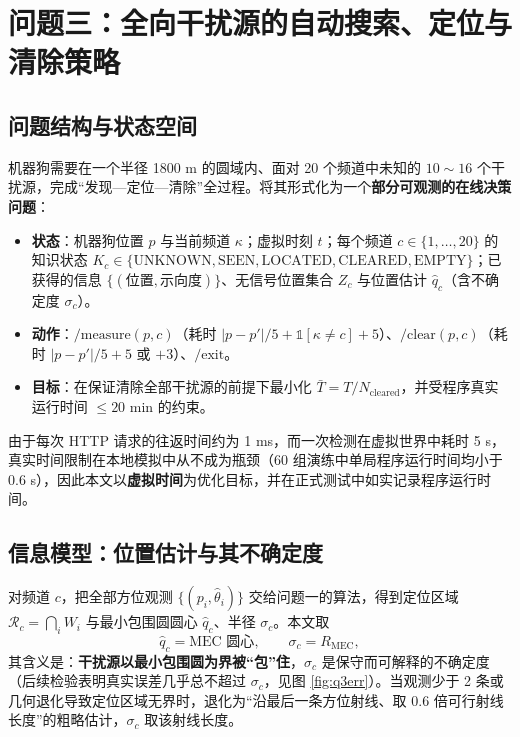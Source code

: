 
\section{问题三：全向干扰源的自动搜索、定位与清除策略}

\subsection{问题结构与状态空间}

机器狗需要在一个半径 1800 m 的圆域内、面对 20 个频道中未知的 $10\sim16$ 个干扰源，完成“发现—定位—清除”全过程。将其形式化为一个\textbf{部分可观测的在线决策问题}：

\begin{itemize}
  \item \textbf{状态}：机器狗位置 $p$ 与当前频道 $\kappa$；虚拟时刻 $t$；每个频道 $c\in\{1,\dots,20\}$ 的知识状态 $K_c\in\{\text{UNKNOWN},\text{SEEN},\text{LOCATED},\text{CLEARED},\text{EMPTY}\}$；已获得的信息 $\{(\text{位置},\text{示向度})\}$、无信号位置集合 $Z_c$ 与位置估计 $\hat q_c$（含不确定度 $\sigma_c$）。
  \item \textbf{动作}：$\text{/measure}(p,c)$（耗时 $|p-p'|/5+\mathbb 1[\kappa\ne c]+5$）、$\text{/clear}(p,c)$（耗时 $|p-p'|/5+5$ 或 $+3$）、$\text{/exit}$。
  \item \textbf{目标}：在保证清除全部干扰源的前提下最小化 $\bar T=T/N_{\text{cleared}}$，并受程序真实运行时间 $\le20$ min 的约束。
\end{itemize}

由于每次 HTTP 请求的往返时间约为 1 ms，而一次检测在虚拟世界中耗时 5 s，真实时间限制在本地模拟中从不成为瓶颈（60 组演练中单局程序运行时间均小于 0.6 s），因此本文以\textbf{虚拟时间}为优化目标，并在正式测试中如实记录程序运行时间。

\subsection{信息模型：位置估计与其不确定度}

对频道 $c$，把全部方位观测 $\{(p_i,\hat\theta_i)\}$ 交给问题一的算法，得到定位区域 $\mathcal R_c=\bigcap_i W_i$ 与最小包围圆圆心 $\hat q_c$、半径 $\sigma_c$。本文取
\begin{equation}
\hat q_c=\text{MEC 圆心},\qquad \sigma_c=R_{\mathrm{MEC}},
\end{equation}
其含义是：\textbf{干扰源以最小包围圆为界被“包”住}，$\sigma_c$ 是保守而可解释的不确定度（后续检验表明真实误差几乎总不超过 $\sigma_c$，见图 \ref{fig:q3err}）。当观测少于 2 条或几何退化导致定位区域无界时，退化为“沿最后一条方位射线、取 $0.6$ 倍可行射线长度”的粗略估计，$\sigma_c$ 取该射线长度。


